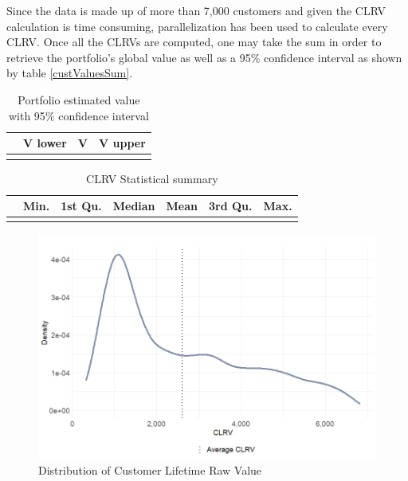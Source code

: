 \documentclass[
]{book}
\begin{document}
Since the data is made up of more than 7,000 customers and given the CLRV calculation is time consuming, parallelization has been used to calculate every CLRV. Once all the CLRVs are computed, one may take the sum in order to retrieve the portfolio's global value as well as a 95\% confidence interval as shown by table \ref{custValuesSum}.

\begin{table}[H]

\caption{\label{tab:custValuesSum}Portfolio estimated value with 95$\%$ confidence interval}
\centering
\begin{tabular}[t]{llll}
\toprule
  & V lower & V & V upper\\
\midrule
\cellcolor{gray!6}{} & \cellcolor{gray!6}{17,604,144} & \cellcolor{gray!6}{18,270,000} & \cellcolor{gray!6}{19,031,648}\\
\bottomrule
\end{tabular}
\end{table}

\begin{table}[H]

\caption{\label{tab:custValuesStats}CLRV Statistical summary}
\centering
\begin{tabular}[t]{lrrrrrr}
\toprule
  & Min. & 1st Qu. & Median & Mean & 3rd Qu. & Max.\\
\midrule
\cellcolor{gray!6}{} & \cellcolor{gray!6}{323.99} & \cellcolor{gray!6}{1125.9} & \cellcolor{gray!6}{2104.66} & \cellcolor{gray!6}{2598.12} & \cellcolor{gray!6}{3850.41} & \cellcolor{gray!6}{6815.42}\\
\bottomrule
\end{tabular}
\end{table}

\begin{figure}

{\centering \includegraphics[width=12.5in]{./imgs/clrv_density} 

}

\caption{Distribution of Customer Lifetime Raw Value}\label{fig:clrvDens}
\end{figure}
\end{document}
